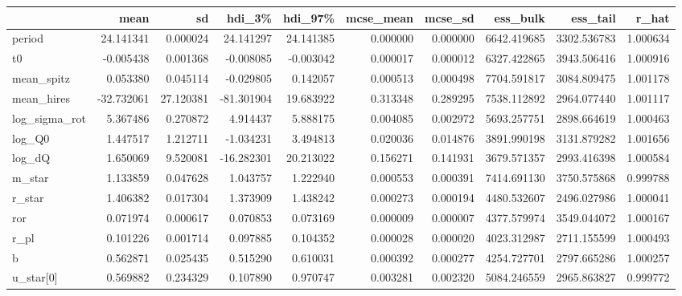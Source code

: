 \begin{tabular}{lrrrrrrrrr}
\toprule
{} &        mean &         sd &      hdi\_3\% &     hdi\_97\% &  mcse\_mean &   mcse\_sd &     ess\_bulk &     ess\_tail &     r\_hat \\
\midrule
period        &   24.141341 &   0.000024 &   24.141297 &   24.141385 &   0.000000 &  0.000000 &  6642.419685 &  3302.536783 &  1.000634 \\
t0            &   -0.005438 &   0.001368 &   -0.008085 &   -0.003042 &   0.000017 &  0.000012 &  6327.422865 &  3943.506416 &  1.000916 \\
mean\_spitz    &    0.053380 &   0.045114 &   -0.029805 &    0.142057 &   0.000513 &  0.000498 &  7704.591817 &  3084.809475 &  1.001178 \\
mean\_hires    &  -32.732061 &  27.120381 &  -81.301904 &   19.683922 &   0.313348 &  0.289295 &  7538.112892 &  2964.077440 &  1.001117 \\
log\_sigma\_rot &    5.367486 &   0.270872 &    4.914437 &    5.888175 &   0.004085 &  0.002972 &  5693.257751 &  2898.664619 &  1.000463 \\
log\_Q0        &    1.447517 &   1.212711 &   -1.034231 &    3.494813 &   0.020036 &  0.014876 &  3891.990198 &  3131.879282 &  1.001656 \\
log\_dQ        &    1.650069 &   9.520081 &  -16.282301 &   20.213022 &   0.156271 &  0.141931 &  3679.571357 &  2993.416398 &  1.000584 \\
m\_star        &    1.133859 &   0.047628 &    1.043757 &    1.222940 &   0.000553 &  0.000391 &  7414.691130 &  3750.575868 &  0.999788 \\
r\_star        &    1.406382 &   0.017304 &    1.373909 &    1.438242 &   0.000273 &  0.000194 &  4480.532607 &  2496.027986 &  1.000041 \\
ror           &    0.071974 &   0.000617 &    0.070853 &    0.073169 &   0.000009 &  0.000007 &  4377.579974 &  3549.044072 &  1.000167 \\
r\_pl          &    0.101226 &   0.001714 &    0.097885 &    0.104352 &   0.000028 &  0.000020 &  4023.312987 &  2711.155599 &  1.000493 \\
b             &    0.562871 &   0.025435 &    0.515290 &    0.610031 &   0.000392 &  0.000277 &  4254.727701 &  2797.665286 &  1.000257 \\
u\_star[0]     &    0.569882 &   0.234329 &    0.107890 &    0.970747 &   0.003281 &  0.002320 &  5084.246559 &  2965.863827 &  0.999772 \\

\end{tabular}
